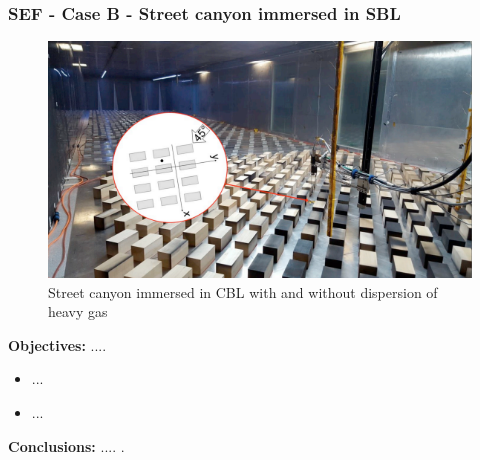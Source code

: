 \subsubsection{SEF - Case B - Street canyon immersed in SBL}
    \begin{figure}[h!]
        \hypertarget{link:sef_A}{}
        \centering
        \includegraphics[scale=0.7]{imgs/sef_dataset_image.png}
        \caption{Street canyon immersed in CBL with and without dispersion
        of heavy gas}
    \end{figure}
    \textbf{Objectives:} ....\newline
    \begin{itemize}
    \item ...
    \item ...
    \end{itemize}
    \textbf{Conclusions:} .... .\newline

